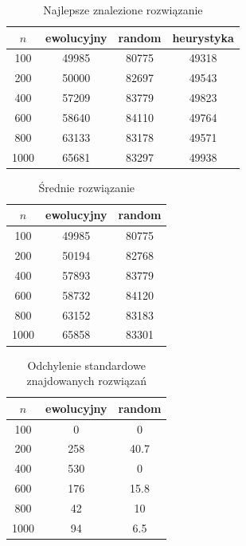 \documentclass[11pt, a4wide]{mwart}
\begin{document}
\begin{table}[H]
\caption{Najlepsze znalezione rozwiązanie}
\label{best}
\begin{center}
\begin{tabular}{c|c|c|c}
  \hline
  $n$ & ewolucyjny & random & heurystyka\\
  \hline
  100 & 49985 & 80775 & 49318 \\
  200 & 50000 & 82697 & 49543 \\
  400 & 57209 & 83779 & 49823\\
  600 & 58640 & 84110 & 49764 \\
  800 & 63133 & 83178 & 49571 \\
  1000 & 65681 & 83297 & 49938 
\end{tabular}
\end{center}
\end{table}



\begin{table}[H]
\caption{Średnie rozwiązanie}
\label{mean}
\begin{center}
\begin{tabular}{c|c|c}
  \hline
  $n$ & ewolucyjny & random\\
  \hline
  100 & 49985 & 80775 \\
  200 & 50194 & 82768 \\
  400 & 57893 & 83779 \\
  600 & 58732 & 84120 \\
  800 & 63152 & 83183 \\
  1000 & 65858 & 83301
\end{tabular}
\end{center}
\end{table}



\begin{table}[H]
\caption{Odchylenie standardowe znajdowanych rozwiązań}
\label{sdev}
\begin{center}
\begin{tabular}{c|c|c}
  \hline
  $n$ & ewolucyjny & random\\
  \hline
  100 & 0 & 0 \\
  200 & 258 & 40.7 \\
  400 & 530 & 0 \\
  600 & 176 & 15.8 \\
  800 & 42 & 10 \\
  1000 & 94 & 6.5
\end{tabular}
\end{center}
\end{table}
\end{document}
